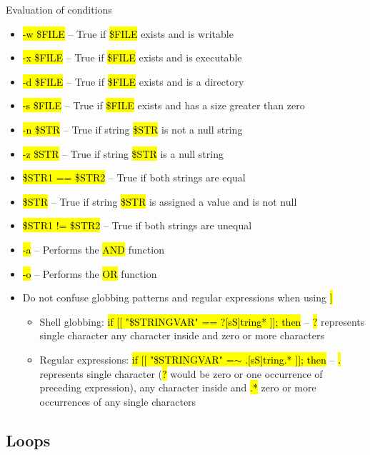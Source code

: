 \documentclass[compress, ucs, xelatex, 11pt, xcolor=svgnames,
  hyperref={
    bookmarks=true,
    unicode=true,
    colorlinks=true,
    pdftitle={Linux, command line and MetaCentrum},
    plainpages=false,
    pdfauthor={Vojtech Zeisek},
    pdfsubject={Course about use of Linux command line, writing shell scripts and using MetaCentrum of CESNET},
    pdfcreator={XeLaTeX},
    pdfkeywords={Linux, GNU, BASH, shell, command line, MetaCentrum},
    linkcolor=DarkRed,
    anchorcolor=DarkBlue,
    citecolor=Indigo,
    filecolor=NavyBlue,
    menucolor=DarkMagenta,
    urlcolor=DarkBlue,
    pdftex},
  url={hyphens, lowtilde} %
  ]{beamer}
\renewcommand{\texttt}[1]{\hl{\ttfamily #1}}
\begin{document}
\begin{frame}[allowframebreaks]{Evaluation of conditions}
\begin{itemize}
  \item \texttt{-w \$FILE} -- True if \texttt{\$FILE} exists and is writable
  \item \texttt{-x \$FILE} -- True if \texttt{\$FILE} exists and is executable
  \item \texttt{-d \$FILE} -- True if \texttt{\$FILE} exists and is a directory
  \item \texttt{-s \$FILE} -- True if \texttt{\$FILE} exists and has a size greater than zero
  \item \texttt{-n \$STR} -- True if string \texttt{\$STR} is not a null string
  \item \texttt{-z \$STR} -- True if string \texttt{\$STR} is a null string
  \item \texttt{\$STR1 == \$STR2} -- True if both strings are equal
  \item \texttt{\$STR} -- True if string \texttt{\$STR} is assigned a value and is not null
  \item \texttt{\$STR1 != \$STR2} -- True if both strings are unequal
  \item \texttt{-a} -- Performs the \texttt{AND} function
  \item \texttt{-o} -- Performs the \texttt{OR} function
  \item Do not confuse globbing patterns and regular expressions when using \texttt{[[ \ldots~]]}
  \begin{itemize}
    \item Shell globbing: \texttt{if [[ "\$STRINGVAR" == ?[sS]tring* ]]; then} -- \texttt{?} represents single character \texttt{[]} any character inside and \texttt{*} zero or more characters
    \item Regular expressions: \texttt{if [[ "\$STRINGVAR" =$\sim$ .[sS]tring.* ]]; then} -- \texttt{.} represents single character (\texttt{?} would be zero or one occurrence of preceding expression), \texttt{[]} any character inside and \texttt{.*} zero or more occurrences of any single characters
  \end{itemize}
\end{itemize}
\end{frame}

\subsection{Loops}
\end{document}
